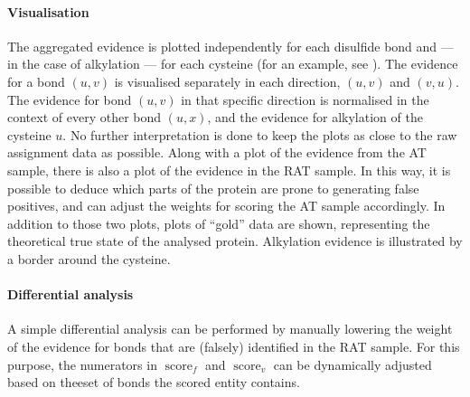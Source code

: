 \paragraph{Visualisation} The aggregated evidence is plotted independently for each disulfide bond and --- in the case of alkylation --- for each cysteine (for an example, see ). The evidence for a bond \((u, v)\) is visualised separately in each direction, \((u, v)\) and \((v, u)\). The evidence for bond \((u, v)\) in that specific direction is normalised in the context of every other bond \((u, x)\), and the evidence for alkylation of the cysteine \(u\). No further interpretation is done to keep the plots as close to the raw assignment data as possible. Along with a plot of the evidence from the AT sample, there is also a plot of the evidence in the RAT sample. In this way, it is possible to deduce which parts of the protein are prone to generating false positives, and can adjust the weights for scoring the AT sample accordingly. In addition to those two plots, plots of ``gold'' data are shown, representing the theoretical true state of the analysed protein. Alkylation evidence is illustrated by a border around the cysteine.

\paragraph{Differential analysis} A simple differential analysis can be performed by manually lowering the weight of the evidence for bonds that are (falsely) identified in the RAT sample. For this purpose, the numerators in \(\operatorname{score}_f\) and \(\operatorname{score}_v\) can be dynamically adjusted based on theeset of bonds the scored entity contains.